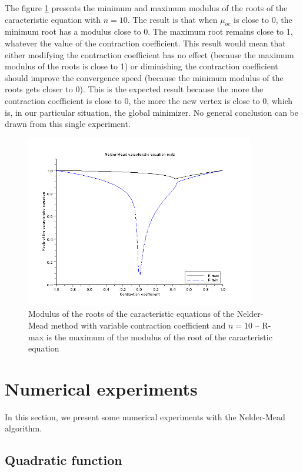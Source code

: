The figure \ref{fig-nm-roots-variable} presents the minimum
and maximum modulus of the roots of the caracteristic equation
with $n=10$. The result is that when $\mu_{oc}$ is close to 0, the 
minimum root has a modulus close to 0. The maximum root remains close to 
1, whatever the value of the contraction coefficient.
This result would mean that either modifying the contraction
coefficient has no effect (because the maximum modulus of the roots 
is close to 1) or diminishing the contraction coefficient should 
improve the convergence speed (because the minimum modulus of the 
roots gets closer to 0). This is the expected result because
the more the contraction coefficient is close to 0, the more the new 
vertex is close to 0, which is, in our particular situation, the 
global minimizer. No general conclusion can be drawn from this single 
experiment.

\begin{figure}
\begin{center}
\includegraphics[width=10cm]{neldermead-roots-variable.png}
\end{center}
\caption{Modulus of the roots of the caracteristic equations of the Nelder-Mead method with variable 
contraction coefficient and $n=10$ -- R-max is the maximum of the modulus of the root of the 
caracteristic equation}
\label{fig-nm-roots-variable}
\end{figure}



\section{Numerical experiments}

In this section, we present some numerical experiments 
with the Nelder-Mead algorithm.

\subsection{Quadratic function}

